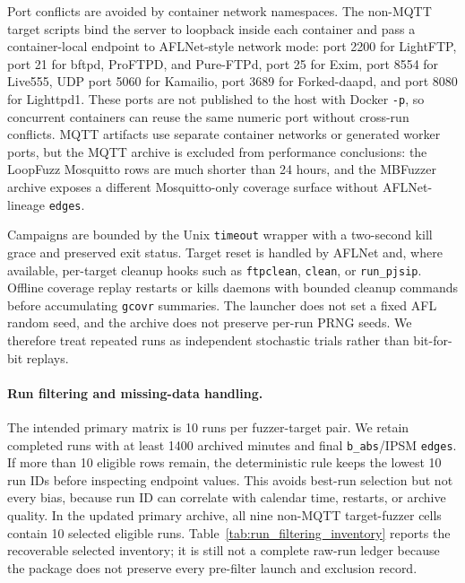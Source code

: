 \documentclass[final,5p,times,number]{elsarticle}
\begin{document}
Port conflicts are avoided by container network namespaces. The non-MQTT target scripts bind the server to loopback inside each container and pass a container-local endpoint to AFLNet-style network mode: port 2200 for LightFTP, port 21 for bftpd, ProFTPD, and Pure-FTPd, port 25 for Exim, port 8554 for Live555, UDP port 5060 for Kamailio, port 3689 for Forked-daapd, and port 8080 for Lighttpd1. These ports are not published to the host with Docker \texttt{-p}, so concurrent containers can reuse the same numeric port without cross-run conflicts. MQTT artifacts use separate container networks or generated worker ports, but the MQTT archive is excluded from performance conclusions: the LoopFuzz Mosquitto rows are much shorter than 24 hours, and the MBFuzzer archive exposes a different Mosquitto-only coverage surface without AFLNet-lineage \texttt{edges}.

Campaigns are bounded by the Unix \texttt{timeout} wrapper with a two-second kill grace and preserved exit status. Target reset is handled by AFLNet and, where available, per-target cleanup hooks such as \texttt{ftpclean}, \texttt{clean}, or \texttt{run\_pjsip}. Offline coverage replay restarts or kills daemons with bounded cleanup commands before accumulating \texttt{gcovr} summaries. The launcher does not set a fixed AFL random seed, and the archive does not preserve per-run PRNG seeds. We therefore treat repeated runs as independent stochastic trials rather than bit-for-bit replays.

\paragraph{Run filtering and missing-data handling.}
The intended primary matrix is 10 runs per fuzzer-target pair. We retain completed runs with at least 1400 archived minutes and final \texttt{b\_abs}/IPSM \texttt{edges}. If more than 10 eligible rows remain, the deterministic rule keeps the lowest 10 run IDs before inspecting endpoint values. This avoids best-run selection but not every bias, because run ID can correlate with calendar time, restarts, or archive quality. In the updated primary archive, all nine non-MQTT target-fuzzer cells contain 10 selected eligible runs. Table~\ref{tab:run_filtering_inventory} reports the recoverable selected inventory; it is still not a complete raw-run ledger because the package does not preserve every pre-filter launch and exclusion record.
\end{document}
